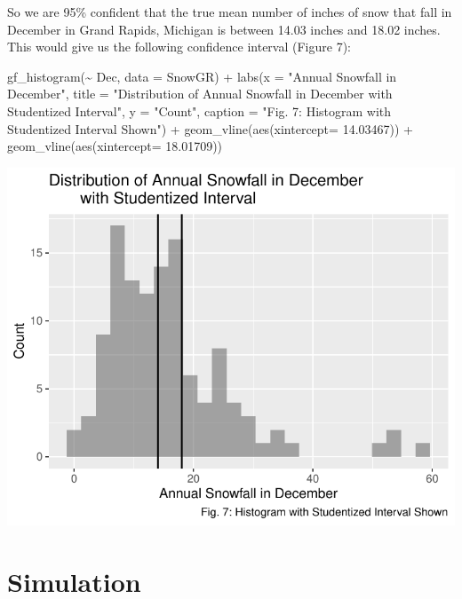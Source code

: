 \documentclass[12pt]{article}
\newenvironment{Shaded}{\begin{snugshade}}{\end{snugshade}}
\newcommand{\AttributeTok}[1]{\textcolor[rgb]{0.77,0.63,0.00}{#1}}
\newcommand{\FloatTok}[1]{\textcolor[rgb]{0.00,0.00,0.81}{#1}}
\newcommand{\FunctionTok}[1]{\textcolor[rgb]{0.00,0.00,0.00}{#1}}
\newcommand{\NormalTok}[1]{#1}
\newcommand{\SpecialCharTok}[1]{\textcolor[rgb]{0.00,0.00,0.00}{#1}}
\newcommand{\StringTok}[1]{\textcolor[rgb]{0.31,0.60,0.02}{#1}}
\begin{document}
So we are 95\% confident that the true mean number of inches of snow
that fall in December in Grand Rapids, Michigan is between 14.03 inches
and 18.02 inches. This would give us the following confidence interval
(Figure 7):

\begin{Shaded}
\begin{Highlighting}[]
\FunctionTok{gf\_histogram}\NormalTok{(}\SpecialCharTok{\textasciitilde{}}\NormalTok{ Dec, }\AttributeTok{data =}\NormalTok{ SnowGR) }\SpecialCharTok{+}
  \FunctionTok{labs}\NormalTok{(}\AttributeTok{x =} \StringTok{"Annual Snowfall in December"}\NormalTok{, }
       \AttributeTok{title =} \StringTok{"Distribution of Annual Snowfall in December}
\StringTok{       with Studentized Interval"}\NormalTok{, }\AttributeTok{y =} \StringTok{"Count"}\NormalTok{, }
       \AttributeTok{caption =} \StringTok{"Fig. 7: Histogram with Studentized Interval Shown"}\NormalTok{) }\SpecialCharTok{+}
  \FunctionTok{geom\_vline}\NormalTok{(}\FunctionTok{aes}\NormalTok{(}\AttributeTok{xintercept=} \FloatTok{14.03467}\NormalTok{)) }\SpecialCharTok{+}
  \FunctionTok{geom\_vline}\NormalTok{(}\FunctionTok{aes}\NormalTok{(}\AttributeTok{xintercept=} \FloatTok{18.01709}\NormalTok{)) }
\end{Highlighting}
\end{Shaded}

\includegraphics{paper_files/figure-latex/unnamed-chunk-17-1.pdf}

\hypertarget{simulation}{%
\section{Simulation}\label{simulation}}
\end{document}
